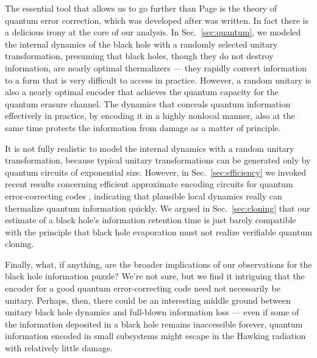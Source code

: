 \documentclass[11pt]{article}
\begin{document}
The essential tool that allows us to go further than Page is the theory of quantum error correction, which was developed after \cite{page-entropy} was written. In fact there is a delicious irony at the core of our analysis. In Sec.~\ref{sec:quantum}, we modeled the internal dynamics of the black hole with a randomly selected unitary transformation, presuming that black holes, though they do not destroy information, are nearly optimal thermalizers --- they rapidly convert information to a form that is very difficult to access in practice. However, a random unitary is also a nearly optimal encoder that achieves the quantum capacity for the quantum erasure channel. The dynamics that conceals quantum information effectively in practice, by encoding it in a highly nonlocal manner, also at the same time protects the information from damage as a matter of principle. 

It is not fully realistic to model the internal dynamics with a random unitary transformation, because typical unitary transformations can be generated only by quantum circuits of exponential size. However, in Sec.~\ref{sec:efficiency} we invoked recent results concerning efficient approximate encoding circuits for quantum error-correcting codes \cite{cleve,dankert}, indicating that plausible local dynamics really can thermalize quantum information quickly. We argued in Sec.~\ref{sec:cloning} that our estimate of a black hole's information retention time is just barely compatible with the principle that black hole evaporation must not realize verifiable quantum cloning.

Finally, what, if anything, are the broader implications of our observations for the black hole information puzzle? We're not sure, but we find it intriguing that the encoder for a good quantum error-correcting code need not necessarily be unitary. Perhaps, then, there could be an interesting middle ground between unitary black hole dynamics and full-blown information loss --- even if some of the information deposited in a black hole remains inaccessible forever, quantum information encoded in small subsystems might escape in the Hawking radiation with relatively little damage.
\end{document}
